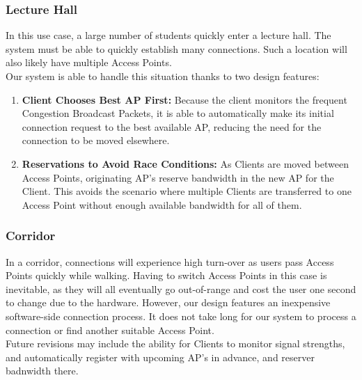 \documentclass[11pt,twocolumn]{article}
\begin{document}
\subsubsection{Lecture Hall}
\indent In this use case, a large number of students quickly enter a lecture hall. The system must be able to quickly establish many connections. Such a location
will also likely have multiple Access Points. \\
\indent Our system is able to handle this situation thanks to two design features:
\begin{enumerate}
	\item \textbf{Client Chooses Best AP First:} Because the client monitors the frequent Congestion Broadcast Packets, it is able to automatically make its
	initial connection request to the best available AP, reducing the need for the connection to be moved elsewhere.
	\item \textbf{Reservations to Avoid Race Conditions:} As Clients are moved between Access Points, originating AP's reserve bandwidth in the new AP for the
	Client. This avoids the scenario where multiple Clients are transferred to one Access Point without enough available bandwidth for all of them.
\end{enumerate}
\subsubsection{Corridor}
\indent In a corridor, connections will experience high turn-over as users pass Access Points quickly while walking. Having to switch Access Points in this case
is inevitable, as they will all eventually go out-of-range and cost the user one second to change due to the hardware. However, our design features an 
inexpensive software-side connection process. It does not take long for our system to process a connection or find another suitable Access Point.\\
\indent Future revisions may include the ability for Clients to monitor signal strengths, and automatically register with upcoming AP's in advance, and reserver badnwidth there.
\end{document}
